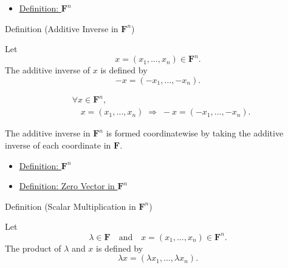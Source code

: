 \begin{dependencies}
\begin{itemize}
  \item \hyperref[def:fn]{Definition: $\mathbf{F}^n$}
\end{itemize}
\end{dependencies}


\begin{definitionbox}{Definition (Additive Inverse in $\mathbf{F}^n$)}
\begin{definition}
\label{def:additive-inverse-in-fn}
Let
\[
x=(x_1,\dots,x_n)\in \mathbf{F}^n.
\]
The additive inverse of $x$ is defined by
\[
-x=(-x_1,\dots,-x_n).
\]
\end{definition}
\end{definitionbox}

\begin{remark*}
\[
\begin{aligned}
&\forall x \in \mathbf{F}^n, \\
&\quad
x=(x_1,\dots,x_n)
\;\Rightarrow\;
-x=(-x_1,\dots,-x_n).
\end{aligned}
\]
\end{remark*}

\begin{remark*}[Interpretation]
The additive inverse in $\mathbf{F}^n$ is formed coordinatewise by taking
the additive inverse of each coordinate in $\mathbf{F}$.
\end{remark*}

\begin{dependencies}
\begin{itemize}
  \item \hyperref[def:fn]{Definition: $\mathbf{F}^n$}
  \item \hyperref[def:zero-vector-in-fn]{Definition: Zero Vector in $\mathbf{F}^n$}
\end{itemize}
\end{dependencies}


\begin{definitionbox}{Definition (Scalar Multiplication in $\mathbf{F}^n$)}
\begin{definition}
\label{def:scalar-multiplication-in-fn}
Let
\[
\lambda \in \mathbf{F}
\quad\text{and}\quad
x=(x_1,\dots,x_n)\in \mathbf{F}^n.
\]
The product of $\lambda$ and $x$ is defined by
\[
\lambda x
=
(\lambda x_1,\dots,\lambda x_n).
\]
\end{definition}
\end{definitionbox}

